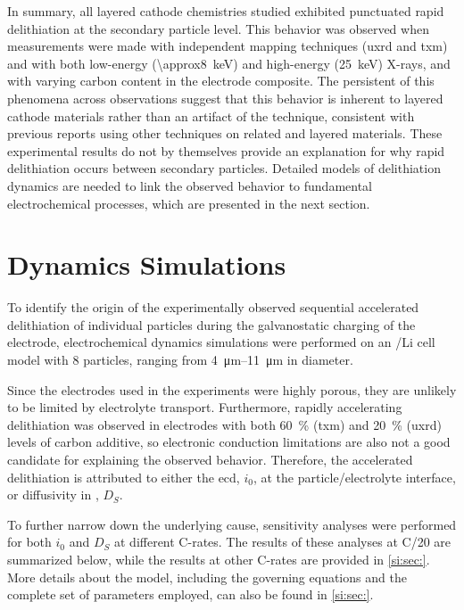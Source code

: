 \documentclass{article}
\begin{document}
In summary, all layered cathode chemistries studied exhibited
punctuated rapid delithiation at the secondary particle level. This
behavior was observed when measurements were made with independent
mapping techniques (\gls{uxrd} and \gls{txm}) and with both low-energy
(\SI{\approx8}{\kilo\electronvolt}) and high-energy
(\SI{25}{\kilo\electronvolt}) X-rays, and with varying carbon content
in the electrode composite. The persistent of this phenomena across
observations suggest that this behavior is inherent to layered cathode
materials rather than an artifact of the technique, consistent with
previous reports using other techniques on related \nmc{} and
 layered
materials\cite{chueh2021,rao2021,wang2020-6}. These experimental
results do not by themselves provide an explanation for why rapid
delithiation occurs between secondary particles. Detailed models of
delithiation dynamics are needed to link the observed behavior to
fundamental electrochemical processes, which are presented in the next
section.

\section{Dynamics Simulations}


To identify the origin of the experimentally observed sequential
accelerated delithiation of individual \nca{} particles during the
galvanostatic charging of the electrode, electrochemical dynamics
simulations were performed on an \nca{}/Li cell model with 8
particles, ranging from \SIrange{4}{11}{\micro\meter} in diameter.

Since the electrodes used in the experiments were highly porous, they
are unlikely to be limited by electrolyte transport. Furthermore,
rapidly accelerating delithiation was observed in electrodes with both
\SI{60}{\percent} (\gls{txm}) and \SI{20}{\percent} (\gls{uxrd})
levels of carbon additive, so electronic conduction limitations are
also not a good candidate for explaining the observed
behavior. Therefore, the accelerated delithiation is attributed to
either the \gls{ecd}, $i_0$, at the particle/electrolyte interface, or
 diffusivity in \nca{}, $D_S$.

To further narrow down the underlying cause, sensitivity analyses were
performed for both $i_0$ and $D_S$ at different C-rates. The results
of these analyses at C/20 are summarized below, while the results at
other C-rates are provided in 
\ref{si:sec:}. More details about the model, including the governing
equations and the complete set of parameters employed, can also be
found in  \ref{si:sec:}.
\end{document}
